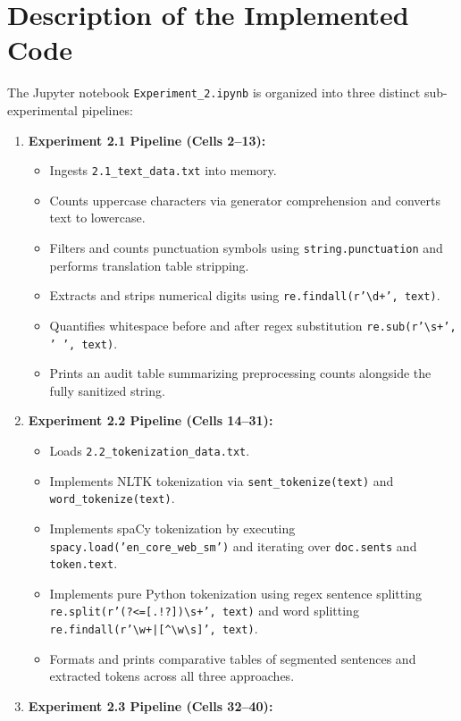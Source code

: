 \section{Description of the Implemented Code}
The Jupyter notebook \texttt{Experiment\_2.ipynb} is organized into three distinct sub-experimental pipelines:
\begin{enumerate}
    \item \textbf{Experiment 2.1 Pipeline (Cells 2--13):}
    \begin{itemize}
        \item Ingests \texttt{2.1\_text\_data.txt} into memory.
        \item Counts uppercase characters via generator comprehension and converts text to lowercase.
        \item Filters and counts punctuation symbols using \texttt{string.punctuation} and performs translation table stripping.
        \item Extracts and strips numerical digits using \texttt{re.findall(r'\textbackslash d+', text)}.
        \item Quantifies whitespace before and after regex substitution \texttt{re.sub(r'\textbackslash s+', ' ', text)}.
        \item Prints an audit table summarizing preprocessing counts alongside the fully sanitized string.
    \end{itemize}
    \item \textbf{Experiment 2.2 Pipeline (Cells 14--31):}
    \begin{itemize}
        \item Loads \texttt{2.2\_tokenization\_data.txt}.
        \item Implements NLTK tokenization via \texttt{sent\_tokenize(text)} and \texttt{word\_tokenize(text)}.
        \item Implements spaCy tokenization by executing \texttt{spacy.load('en\_core\_web\_sm')} and iterating over \texttt{doc.sents} and \texttt{token.text}.
        \item Implements pure Python tokenization using regex sentence splitting \texttt{re.split(r'(?<=[.!?])\textbackslash s+', text)} and word splitting \texttt{re.findall(r'\textbackslash w+|[\textasciicircum\textbackslash w\textbackslash s]', text)}.
        \item Formats and prints comparative tables of segmented sentences and extracted tokens across all three approaches.
    \end{itemize}
    \item \textbf{Experiment 2.3 Pipeline (Cells 32--40):}

\end{enumerate}
